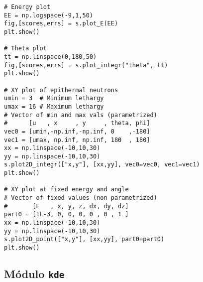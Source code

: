 \begin{lstlisting}[language=Python2, label={lst:exa-plot}, caption=Ejemplo de gráficos de distribuciones estimadas.]
# Energy plot
EE = np.logspace(-9,1,50)
fig,[scores,errs] = s.plot_E(EE)
plt.show()

# Theta plot
tt = np.linspace(0,180,50)
fig,[scores,errs] = s.plot_integr("theta", tt)
plt.show()

# XY plot of epithermal neutrons
umin = 3  # Minimum lethargy
umax = 16 # Maximum lethargy
# Vector of min and max vals (parametrized)
#      [u   , x     , y     , theta, phi]
vec0 = [umin,-np.inf,-np.inf, 0    ,-180]
vec1 = [umax, np.inf, np.inf, 180  , 180]
xx = np.linspace(-10,10,30)
yy = np.linspace(-10,10,30)
s.plot2D_integr(["x,y"], [xx,yy], vec0=vec0, vec1=vec1)
plt.show()

# XY plot at fixed energy and angle
# Vector of fixed values (non parametrized)
#       [E   , x, y, z, dx, dy, dz]
part0 = [1E-3, 0, 0, 0, 0 , 0 , 1 ]
xx = np.linspace(-10,10,30)
yy = np.linspace(-10,10,30)
s.plot2D_point(["x,y"], [xx,yy], part0=part0)
plt.show()
\end{lstlisting}


\subsection{Módulo \texttt{kde}}

